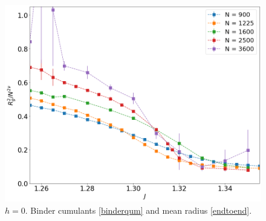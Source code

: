 \begin{figure}[H]
 	\includegraphics[scale=0.23]{Images/rscaling_longchains.png} 	
 	
 	\caption{$h=0$. Binder  cumulants \eqref{binderqum} and mean radius \eqref{endtoend}.  }
 	\label{fig:bcshort}
 \end{figure}

